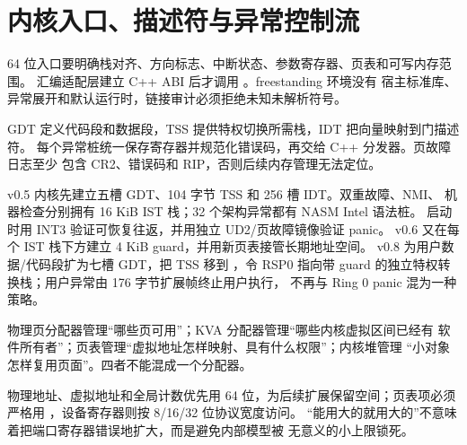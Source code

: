 \section{内核入口、描述符与异常控制流}

64 位入口要明确栈对齐、方向标志、中断状态、参数寄存器、页表和可写内存范围。
汇编适配层建立 C++ ABI 后才调用 。freestanding 环境没有
宿主标准库、异常展开和默认运行时，链接审计必须拒绝未知未解析符号。

GDT 定义代码段和数据段，TSS 提供特权切换所需栈，IDT 把向量映射到门描述符。
每个异常桩统一保存寄存器并规范化错误码，再交给 C++ 分发器。页故障日志至少
包含 CR2、错误码和 RIP，否则后续内存管理无法定位。

v0.5 内核先建立五槽 GDT、104 字节 TSS 和 256 槽 IDT。双重故障、NMI、
机器检查分别拥有 16 KiB IST 栈；32 个架构异常都有 NASM Intel 语法桩。
启动时用 INT3 验证可恢复往返，并用独立 UD2/页故障镜像验证 panic。
v0.6 又在每个 IST 栈下方建立 4 KiB guard，并用新页表接管长期地址空间。
v0.8 为用户数据/代码段扩为七槽 GDT，把 TSS 移到 ，令 RSP0
指向带 guard 的独立特权转换栈；用户异常由 176 字节扩展帧终止用户执行，
不再与 Ring 0 panic 混为一种策略。

物理页分配器管理“哪些页可用”；KVA 分配器管理“哪些内核虚拟区间已经有
软件所有者”；页表管理“虚拟地址怎样映射、具有什么权限”；内核堆管理
“小对象怎样复用页面”。四者不能混成一个分配器。

\begin{center}
\end{center}

物理地址、虚拟地址和全局计数优先用 64 位，为后续扩展保留空间；页表项必须
严格用 ，设备寄存器则按 8/16/32 位协议宽度访问。
“能用大的就用大的”不意味着把端口寄存器错误地扩大，而是避免内部模型被
无意义的小上限锁死。


